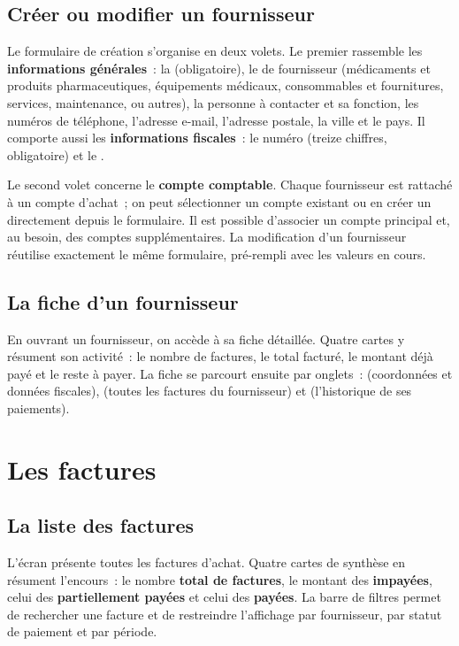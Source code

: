 
\section{Créer ou modifier un fournisseur}
Le formulaire de création s'organise en deux volets. Le premier rassemble les \textbf{informations générales}~: la  (obligatoire), le  de fournisseur (médicaments et produits pharmaceutiques, équipements médicaux, consommables et fournitures, services, maintenance, ou autres), la personne à contacter et sa fonction, les numéros de téléphone, l'adresse e-mail, l'adresse postale, la ville et le pays. Il comporte aussi les \textbf{informations fiscales}~: le numéro  (treize chiffres, obligatoire) et le .

Le second volet concerne le \textbf{compte comptable}. Chaque fournisseur est rattaché à un compte d'achat~; on peut sélectionner un compte existant ou en créer un directement depuis le formulaire. Il est possible d'associer un compte principal et, au besoin, des comptes supplémentaires. La modification d'un fournisseur réutilise exactement le même formulaire, pré-rempli avec les valeurs en cours.

\section{La fiche d'un fournisseur}
En ouvrant un fournisseur, on accède à sa fiche détaillée. Quatre cartes y résument son activité~: le nombre de factures, le total facturé, le montant déjà payé et le reste à payer. La fiche se parcourt ensuite par onglets~:  (coordonnées et données fiscales),  (toutes les factures du fournisseur) et  (l'historique de ses paiements).


\chapter{Les factures}

\section{La liste des factures}
L'écran  présente toutes les factures d'achat. Quatre cartes de synthèse en résument l'encours~: le nombre \textbf{total de factures}, le montant des \textbf{impayées}, celui des \textbf{partiellement payées} et celui des \textbf{payées}. La barre de filtres permet de rechercher une facture et de restreindre l'affichage par fournisseur, par statut de paiement et par période.

